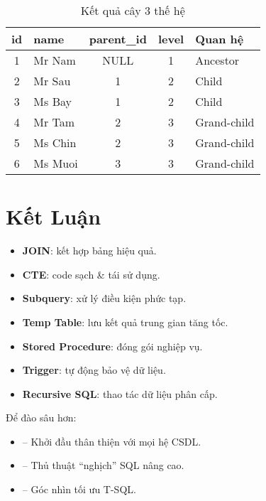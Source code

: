 \begin{table}[H]
\centering
\caption{Kết quả cây 3 thế hệ}
\begin{tabular}{|c|l|c|c|l|}
\hline
id & name & parent\_id & level & Quan hệ \\ \hline
1 & Mr Nam  & NULL & 1 & Ancestor \\ \hline
2 & Mr Sau  & 1    & 2 & Child \\ \hline
3 & Ms Bay  & 1    & 2 & Child \\ \hline
4 & Mr Tam  & 2    & 3 & Grand-child \\ \hline
5 & Ms Chin & 2    & 3 & Grand-child \\ \hline
6 & Ms Muoi & 3    & 3 & Grand-child \\ \hline
\end{tabular}
\end{table}

\section{Kết Luận}

\begin{itemize}
  \item \textbf{JOIN}: kết hợp bảng hiệu quả.  
  \item \textbf{CTE}: code sạch \& tái sử dụng.  
  \item \textbf{Subquery}: xử lý điều kiện phức tạp.  
  \item \textbf{Temp Table}: lưu kết quả trung gian tăng tốc.  
  \item \textbf{Stored Procedure}: đóng gói nghiệp vụ.  
  \item \textbf{Trigger}: tự động bảo vệ dữ liệu.  
  \item \textbf{Recursive SQL}: thao tác dữ liệu phân cấp.  
\end{itemize}

Để đào sâu hơn:

\begin{itemize}
  \item \cite{beaulieu2020} – Khởi đầu thân thiện với mọi hệ CSDL.  
  \item \cite{celko2015} – Thủ thuật “nghịch” SQL nâng cao.  
  \item \cite{benGan2015} – Góc nhìn tối ưu T-SQL.  
\end{itemize}

\nocite{*} %

